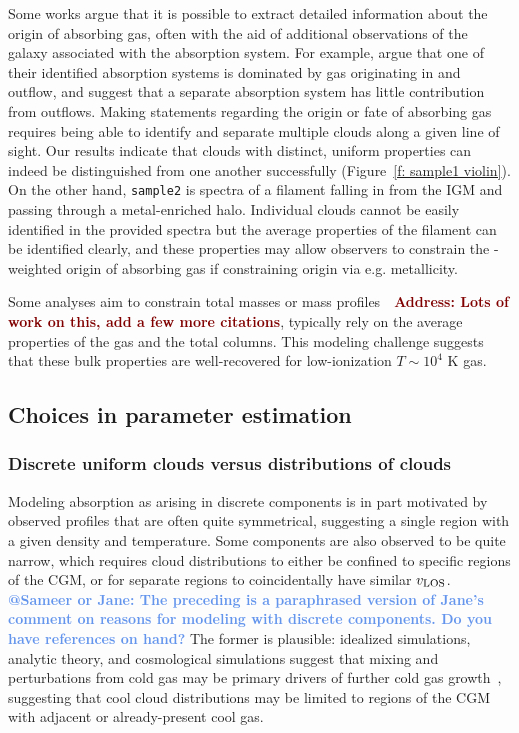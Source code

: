 \documentclass[fleqn,usenatbib]{mnras}
\makeatletter
\newcommand{\todo}[1]{\textcolor{Maroon}{\textbf{Address: #1}}}
\newcommand{\atsameer}[1]{\textcolor{CornflowerBlue}{\textbf{@Sameer or Jane: #1}}}
\makeatother
\begin{document}
Some works argue that it is possible to extract detailed information about the origin of absorbing gas, often with the aid of additional observations of the galaxy associated with the absorption system.
For example, \cite{Peroux2013} argue that one of their identified absorption systems is dominated by gas originating in and outflow, and \cite{Peroux2017} suggest that a separate absorption system has little contribution from outflows.
Making statements regarding the origin or fate of absorbing gas requires being able to identify and separate multiple clouds along a given line of sight.
Our results indicate that clouds with distinct, uniform properties can indeed be distinguished from one another successfully (Figure~\ref{f: sample1 violin}).
On the other hand, \texttt{sample2} is spectra of a filament falling in from the IGM and passing through a metal-enriched halo.
Individual clouds cannot be easily identified in the provided spectra
but the average properties of the filament can be identified clearly,
and these properties may allow observers to constrain the -weighted origin of absorbing gas if constraining origin via e.g. metallicity.

Some analyses aim to constrain total masses or mass profiles~\citep[e.g.][]{Zahedy2019a}~\todo{Lots of work on this, add a few more citations}, typically rely on the average properties of the gas and the total columns.
This modeling challenge suggests that these bulk properties are well-recovered for low-ionization $T \sim 10^4$ K gas.

\subsection{Choices in parameter estimation}

\subsubsection{Discrete uniform clouds versus distributions of clouds}

Modeling absorption as arising in discrete components is in part motivated by observed profiles that are often quite symmetrical,
suggesting a single region with a given density and temperature. 
Some components are also observed to be quite narrow, 
which requires cloud distributions to either be confined to specific regions of the CGM,
or for separate regions to coincidentally have similar $v_{\rm LOS}$.
\atsameer{The preceding is a paraphrased version of Jane's comment on reasons for modeling with discrete components. Do you have references on hand?}
The former is plausible:
idealized simulations, analytic theory, and cosmological simulations suggest that mixing and perturbations from cold gas may be primary drivers of further cold gas growth~\citep[e.g.][]{esmerian2021Thermal, gronke2021Survival, gronke2022Cooling},
suggesting that cool cloud distributions may be limited to regions of the CGM with adjacent or already-present cool gas.
\end{document}
